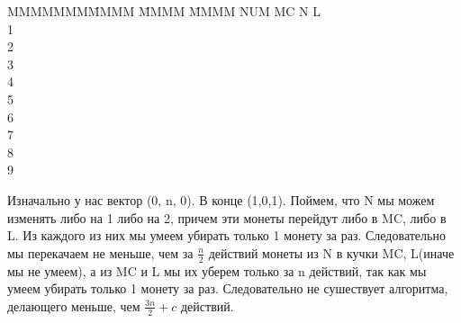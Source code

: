 \documentclass[a4paper,12pt]{article}
\begin{document}
\begin{tabbing}
MMMMMMM\= MMMM \= MMMM \= MMMM \kill
NUM \> MC  \>  N  \> L \\ %
1   \\
2   \\
3   \\
4   \\
5   \\
6   \\
7   \\
8   \\
9   
\end{tabbing}
Изначально у нас вектор (0, n, 0). В конце (1,0,1).
 Поймем, что N мы можем изменять либо на 1 либо на 2, причем эти монеты перейдут либо в MC, либо в L. Из каждого из них мы умеем убирать только 1 монету за раз. Следовательно мы перекачаем не меньше, чем за $\frac{n}{2}$ действий монеты из N в кучки MC, L(иначе мы не умеем), а из MC и L мы их уберем только за n действий, так как мы умеем убирать только 1 монету за раз. Следовательно не сушествует алгоритма, делающего меньше, чем $\frac{3n}{2}+c$ действий.
\end{document}
